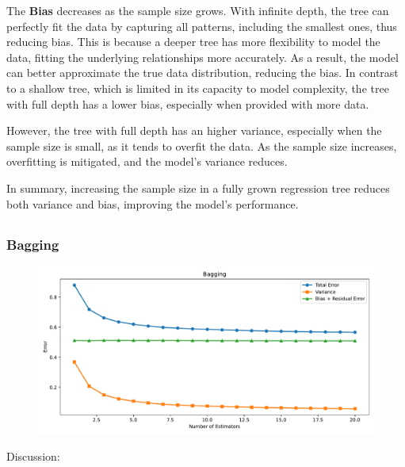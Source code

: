 \documentclass[a4paper,10pt]{article}
\begin{document}
The \textbf{Bias} decreases as the sample size grows. With infinite depth, the tree can perfectly fit the data by capturing all patterns, including the smallest ones, thus reducing bias. This is because a deeper tree has more flexibility to model the data, fitting the underlying relationships more accurately. As a result, the model can better approximate the true data distribution, reducing the bias. In contrast to a shallow tree, which is limited in its capacity to model complexity, the tree with full depth has a lower bias, especially when provided with more data.

However, the tree with full depth has an higher variance, especially when the sample size is small, as it tends to overfit the data. As the sample size increases, overfitting is mitigated, and the model's variance reduces.

In summary, increasing the sample size in a fully grown regression tree reduces both variance and bias, improving the model’s performance.





\subsection{}

\subsubsection{Bagging}
\begin{figure}[H]
    \centering
    \includegraphics[width=0.8\linewidth]{images/2.5_bagging.pdf}
\end{figure}

Discussion:
        
\end{document}
